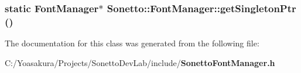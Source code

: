 \subsubsection{\setlength{\rightskip}{0pt plus 5cm}static {\bf FontManager}$\ast$ Sonetto::FontManager::getSingletonPtr ()\hspace{0.3cm}{\tt  [static]}}\label{class_sonetto_1_1_font_manager_e3fd689f6e1a408de75a3444f2eec3da}




The documentation for this class was generated from the following file:\begin{CompactItemize}
\item 
C:/Yoasakura/Projects/SonettoDevLab/include/{\bf SonettoFontManager.h}\end{CompactItemize}
